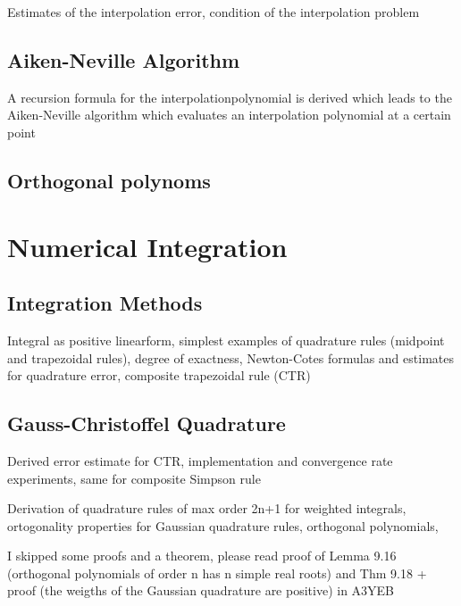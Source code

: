 \documentclass{article}
\theoremstyle{remark}
\begin{document}
\begin{tcolorbox}
  Estimates of the interpolation error, condition of the interpolation problem	
\end{tcolorbox}

\subsection{Aiken-Neville Algorithm}%
\label{sub:aiken_neville_algorithm}


\begin{tcolorbox}
  A recursion formula for the interpolationpolynomial is derived  which leads to the Aiken-Neville algorithm which evaluates an interpolation polynomial at a certain point	
\end{tcolorbox}


\subsection{Orthogonal polynoms}%
\label{sub:orthogonal_polynoms}

\newpage
\section{Numerical Integration}%
\label{sec:numerical_integration}

\subsection{Integration Methods}%
\label{sub:trapezoid_rule}
\begin{tcolorbox}
  Integral as positive linearform, simplest examples of  quadrature rules (midpoint and trapezoidal rules), degree of exactness, Newton-Cotes formulas and estimates for quadrature error, composite trapezoidal rule (CTR)
\end{tcolorbox}

\subsection{Gauss-Christoffel Quadrature}%
\label{sub:gauss_christoffel_quadrature}
\begin{tcolorbox}
  Derived error estimate for CTR, implementation and convergence rate experiments, same for composite Simpson rule	
\end{tcolorbox}

\begin{tcolorbox}
  Derivation of quadrature rules of max order 2n+1 for weighted integrals, ortogonality properties for Gaussian quadrature rules, orthogonal polynomials,

I skipped some proofs and a theorem, please read proof of Lemma 9.16 (orthogonal polynomials of order n has n simple real roots)  and Thm 9.18 + proof (the weigths of the Gaussian quadrature are positive) in A3YEB
\end{tcolorbox}
\end{document}
